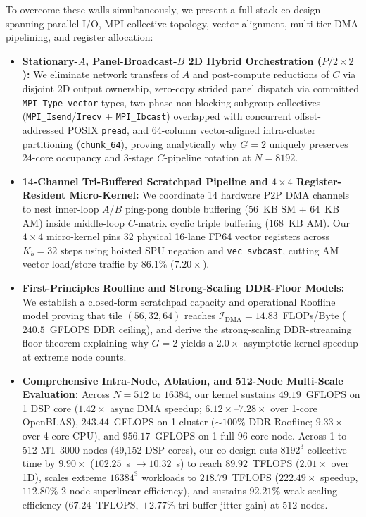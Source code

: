 \documentclass[conference]{IEEEtran}
\begin{document}
To overcome these walls simultaneously, we present a full-stack co-design spanning parallel I/O, MPI collective topology, vector alignment, multi-tier DMA pipelining, and register allocation:
\begin{itemize}\setlength{\itemsep}{0.5pt}\setlength{\parskip}{0pt}
    \item \textbf{Stationary-$A$, Panel-Broadcast-$B$ 2D Hybrid Orchestration ($P/2 \times 2$):} We eliminate network transfers of $A$ and post-compute reductions of $C$ via disjoint 2D output ownership, zero-copy strided panel dispatch via committed \texttt{MPI\_Type\_vector} types, two-phase non-blocking subgroup collectives (\texttt{MPI\_Isend}/\texttt{Irecv} + \texttt{MPI\_Ibcast}) overlapped with concurrent offset-addressed POSIX \texttt{pread}, and 64-column vector-aligned intra-cluster partitioning (\texttt{chunk\_64}), proving analytically why $G=2$ uniquely preserves 24-core occupancy and 3-stage $C$-pipeline rotation at $N=8192$.
    \item \textbf{14-Channel Tri-Buffered Scratchpad Pipeline and $4 \times 4$ Register-Resident Micro-Kernel:} We coordinate 14 hardware P2P DMA channels to nest inner-loop $A/B$ ping-pong double buffering ($56$~KB SM + $64$~KB AM) inside middle-loop $C$-matrix cyclic triple buffering ($168$~KB AM). Our $4 \times 4$ micro-kernel pins 32 physical 16-lane FP64 vector registers across $K_b=32$ steps using hoisted SPU negation and \texttt{vec\_svbcast}, cutting AM vector load/store traffic by $86.1\%$ ($7.20\times$).
    \item \textbf{First-Principles Roofline and Strong-Scaling DDR-Floor Models:} We establish a closed-form scratchpad capacity and operational Roofline model proving that tile $(56, 32, 64)$ reaches $\mathcal{I}_{\mathrm{DMA}} = 14.83$~FLOPs/Byte ($240.5$~GFLOPS DDR ceiling), and derive the strong-scaling DDR-streaming floor theorem explaining why $G=2$ yields a $2.0\times$ asymptotic kernel speedup at extreme node counts.
    \item \textbf{Comprehensive Intra-Node, Ablation, and 512-Node Multi-Scale Evaluation:} Across $N=512$ to $16384$, our kernel sustains $49.19$~GFLOPS on 1 DSP core ($1.42\times$ async DMA speedup; $6.12\times$--$7.28\times$ over 1-core OpenBLAS), $243.44$~GFLOPS on 1 cluster ($\sim\!100\%$ DDR Roofline; $9.33\times$ over 4-core CPU), and $956.17$~GFLOPS on 1 full 96-core node. Across 1 to 512 MT-3000 nodes (49,152 DSP cores), our co-design cuts $8192^3$ collective time by $9.90\times$ ($102.25$~s $\to 10.32$~s) to reach $89.92$~TFLOPS ($2.01\times$ over 1D), scales extreme $16384^3$ workloads to $218.79$~TFLOPS ($222.49\times$ speedup, $112.80\%$ 2-node superlinear efficiency), and sustains $92.21\%$ weak-scaling efficiency ($67.24$~TFLOPS, $+2.77\%$ tri-buffer jitter gain) at 512 nodes.
\end{itemize}
\end{document}
